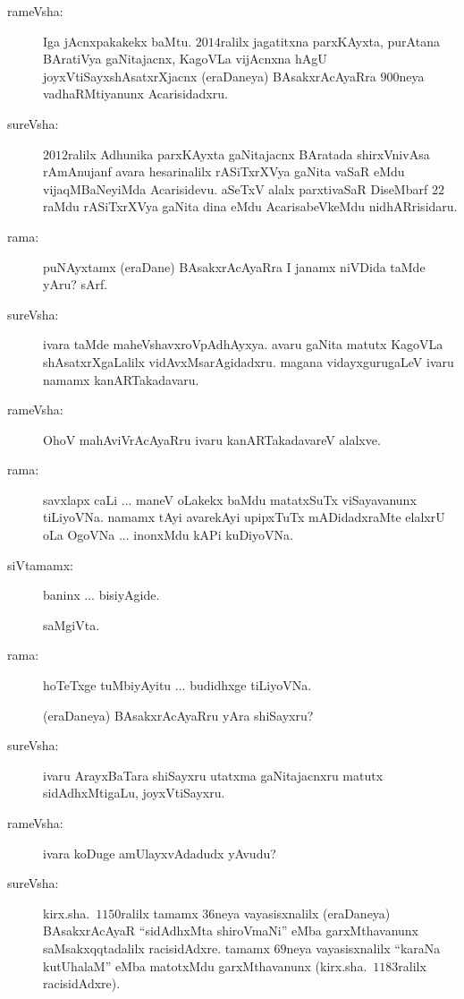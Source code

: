 \begin{description}
\item[rameVsha:] Iga jAcnxpakakekx baMtu. $2014$ralilx jagatitxna parxKAyxta, purAtana BAratiVya gaNitajacnx, KagoVLa vijAcnxna hAgU joyxVtiSayxshAsatxrXjacnx (eraDaneya) BAsakxrAcAyaRra $900$neya vadhaRMtiyanunx Acarisidadxru.

\item[sureVsha:] $2012$ralilx Adhunika parxKAyxta gaNitajacnx BAratada shirxVnivAsa rAmAnujanf avara hesarinalilx rASiTxrXVya gaNita vaSaR eMdu vijaqMBaNeyiMda Acarisidevu. aSeTxV alalx parxtivaSaR DiseMbarf $22$raMdu rASiTxrXVya gaNita dina eMdu AcarisabeVkeMdu nidhARrisidaru.

\item[rama:] puNAyxtamx (eraDane) BAsakxrAcAyaRra I janamx niVDida taMde yAru? sArf.

\item[sureVsha:] ivara taMde maheVshavxroVpAdhAyxya. avaru gaNita matutx KagoVLa shAsatxrXgaLalilx vidAvxMsarAgidadxru. magana vidayxgurugaLeV ivaru namamx kanARTakadavaru.

\item[rameVsha:] OhoV mahAviVrAcAyaRru ivaru kanARTakadavareV alalxve.

\item[rama:] savxlapx caLi ... maneV oLakekx baMdu matatxSuTx viSayavanunx tiLiyoVNa. namamx tAyi avarekAyi upipxTuTx mADidadxraMte elalxrU oLa OgoVNa ... inonxMdu kAPi kuDiyoVNa.

\item[siVtamamx:] baninx ... bisiyAgide.

saMgiVta.

\item[rama:] hoTeTxge tuMbiyAyitu ... budidhxge tiLiyoVNa.

(eraDaneya) BAsakxrAcAyaRru yAra shiSayxru?

\item[sureVsha:] ivaru ArayxBaTara shiSayxru utatxma gaNitajacnxru matutx sidAdhxMtigaLu, joyxVtiSayxru.

\item[rameVsha:] ivara koDuge amUlayxvAdadudx yAvudu?

\item[sureVsha:] kirx.sha.\ $1150$ralilx tamamx $36$neya vayasisxnalilx (eraDaneya) BAsakxrAcAyaR ``sidAdhxMta shiroVmaNi'' eMba garxMthavanunx saMsakxqqtadalilx racisidAdxre. tamamx $69$neya vayasisxnalilx ``karaNa kutUhalaM'' eMba matotxMdu garxMthavanunx (kirx.sha.\ $1183$ralilx racisidAdxre).


\end{description}

